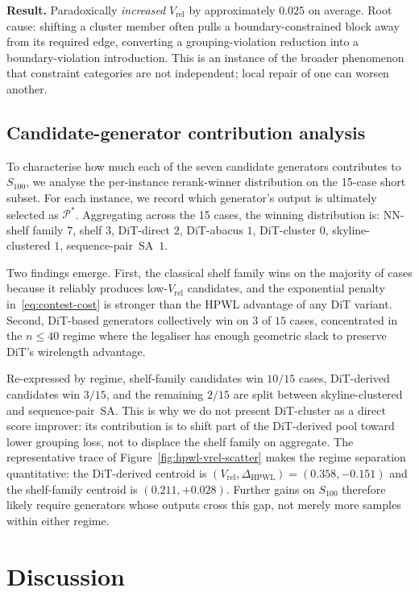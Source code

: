\documentclass[nolineno]{ieeeaccess}
\begin{document}
\textbf{Result.} Paradoxically \emph{increased} $V_{\text{rel}}$ by
approximately $0.025$ on average. Root cause: shifting a cluster member
often pulls a boundary-constrained block away from its required edge,
converting a grouping-violation reduction into a
boundary-violation introduction. This is an instance of the broader
phenomenon that constraint categories are not independent; local
repair of one can worsen another.

\subsection{Candidate-generator contribution analysis}
\label{sec:ablation-loo}
To characterise how much each of the seven candidate generators
contributes to $S_{100}$, we analyse the per-instance rerank-winner
distribution on the 15-case short subset. For each instance, we
record which generator's output is ultimately selected as
$\mathcal{P}^{*}$. Aggregating across the 15 cases, the winning
distribution is: NN-shelf family $7$, shelf $3$, DiT-direct $2$,
DiT-abacus $1$, DiT-cluster $0$, skyline-clustered $1$,
sequence-pair~SA~$1$.

Two findings emerge. First, the classical shelf family wins on the
majority of cases because it reliably produces low-$V_{\text{rel}}$
candidates, and the exponential penalty in~\eqref{eq:contest-cost} is
stronger than the HPWL advantage of any DiT variant. Second, DiT-based
generators collectively win on $3$ of $15$ cases, concentrated in the
$n \le 40$ regime where the legaliser has enough geometric slack to
preserve DiT's wirelength advantage.

Re-expressed by regime, shelf-family candidates win $10/15$ cases,
DiT-derived candidates win $3/15$, and the remaining $2/15$ are split
between skyline-clustered and sequence-pair~SA. This is why we do not
present DiT-cluster as a direct score improver: its contribution is to
shift part of the DiT-derived pool toward lower grouping loss, not to
displace the shelf family on aggregate. The representative trace of
Figure~\ref{fig:hpwl-vrel-scatter} makes the regime separation
quantitative: the DiT-derived centroid is
$(V_{\text{rel}},\Delta_{\text{HPWL}})=(0.358,-0.151)$ and the
shelf-family centroid is $(0.211,+0.028)$. Further gains on $S_{100}$
therefore likely require generators whose outputs cross this gap,
not merely more samples within either regime.

\section{Discussion}
\label{sec:discussion}
\end{document}
